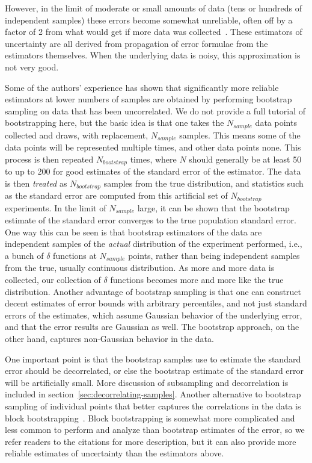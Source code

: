 \documentclass[9pt,bestpractices]{livecoms}
\begin{document}
However, in the limit of moderate or small amounts of data (tens or hundreds of independent samples) these errors become somewhat unreliable, often off by a factor of 2 from what would get if more data was collected~\cite{???}. These estimators of uncertainty are all derived from propagation of error formulae from the estimators themselves. When the underlying data is noisy, this approximation is not very good.

Some of the authors' experience has shown that significantly more reliable estimators at lower numbers of samples are obtained by performing bootstrap sampling on data that has been uncorrelated. We do not provide a full tutorial of bootstrapping here, but the basic idea is that one takes the $N_{sample}$ data points collected and draws, with replacement, $N_{sample}$ samples.  This means some of the data points will be represented multiple times, and other data points none. This process is then repeated $N_{bootstrap}$ times, where $N$ should generally be at least 50 to up to 200 for good estimates of the standard error of the estimator.  The data is then \textit{treated} as $N_{bootstrap}$ samples from the true distribution, and statistics such as the standard error are computed from this artificial set of $N_{bootstrap}$ experiments.  In the limit of $N_{sample}$ large, it can be shown that the bootstrap estimate of the standard error converges to the true population standard error.  One way this can be seen is that bootstrap estimators of the data are independent samples of the \textit{actual} distribution of the experiment performed, i.e., a bunch of $\delta$ functions at $N_{sample}$ points, rather than being independent samples from the true, usually continuous distribution.  As more and more data is collected, our collection of $\delta$ functions becomes more and more like the true distribution. Another advantage of bootstrap sampling is that one can construct decent estimates of error bounds with arbitrary percentiles, and not just standard errors of the estimates, which assume Gaussian behavior of the underlying error, and that the error results are Gaussian as well.  The bootstrap approach, on the other hand, captures non-Gaussian behavior in the data. 

One important point is that the bootstrap samples use to estimate the standard error should be decorrelated, or else the bootstrap estimate of the standard error will be artificially small.  More discussion of subsampling and decorrelation is included in section~\ref{sec:decorrelating-samples}. Another alternative to bootstrap sampling of individual points that better captures the correlations in the data is block bootstrapping~\cite{???}.  Block bootstrapping is somewhat more complicated and less common to perform and analyze than bootstrap estimates of the error, so we refer readers to the citations for more description, but it can also provide more reliable estimates of uncertainty than the estimators above.
\end{document}
